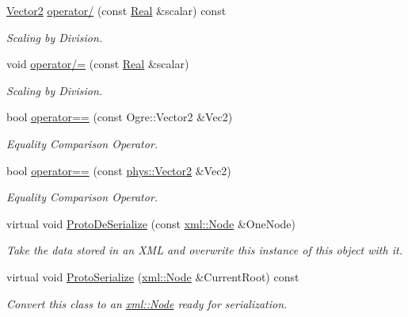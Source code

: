 \begin{DoxyCompactItemize}
\hyperlink{classphys_1_1Vector2}{Vector2} \hyperlink{classphys_1_1Vector2_a51f7d8ce03f7ab05137b277532edf93b}{operator/} (const \hyperlink{namespacephys_af7eb897198d265b8e868f45240230d5f}{Real} \&scalar) const 
\begin{DoxyCompactList}\small\item\em Scaling by Division. \item\end{DoxyCompactList}\item 
void \hyperlink{classphys_1_1Vector2_a27a0da5b4cfa49ea92dd16107692775b}{operator/=} (const \hyperlink{namespacephys_af7eb897198d265b8e868f45240230d5f}{Real} \&scalar)
\begin{DoxyCompactList}\small\item\em Scaling by Division. \item\end{DoxyCompactList}\item 
bool \hyperlink{classphys_1_1Vector2_a2fe433e9401748547b19cc5be891ed52}{operator==} (const Ogre::Vector2 \&Vec2)
\begin{DoxyCompactList}\small\item\em Equality Comparison Operator. \item\end{DoxyCompactList}\item 
bool \hyperlink{classphys_1_1Vector2_a89874b6def8107146ca7079a2de49360}{operator==} (const \hyperlink{classphys_1_1Vector2}{phys::Vector2} \&Vec2)
\begin{DoxyCompactList}\small\item\em Equality Comparison Operator. \item\end{DoxyCompactList}\item 
virtual void \hyperlink{classphys_1_1Vector2_a124eb6c4c935991e41de939e62cf03ee}{ProtoDeSerialize} (const \hyperlink{classphys_1_1xml_1_1Node}{xml::Node} \&OneNode)
\begin{DoxyCompactList}\small\item\em Take the data stored in an XML and overwrite this instance of this object with it. \item\end{DoxyCompactList}\item 
virtual void \hyperlink{classphys_1_1Vector2_a024242f2cfae55cb08243a9cc3ac7a8c}{ProtoSerialize} (\hyperlink{classphys_1_1xml_1_1Node}{xml::Node} \&CurrentRoot) const 
\begin{DoxyCompactList}\small\item\em Convert this class to an \hyperlink{classphys_1_1xml_1_1Node}{xml::Node} ready for serialization. \item\end{DoxyCompactList}\item 

\end{DoxyCompactItemize}
